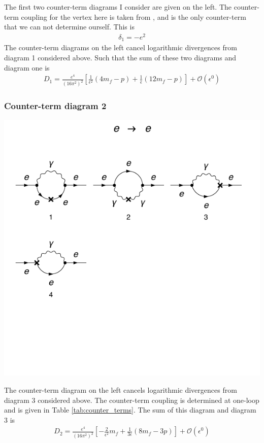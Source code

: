 \documentclass[11pt]{article}
\begin{document}
\noindent\begin{minipage}{0.7\textwidth}
The first two counter-term diagrams I consider are given on the left.  The counter-term coupling for the vertex here is taken from \cite{Sato2013}, and is the only counter-term that we can not determine ourself.  This is
\begin{align}
\delta_{1}=-e^2
\end{align}
The counter-term diagrams on the left cancel logarithmic divergences from diagram 1 considered above.  Such that the sum of these two diagrams and diagram one is
\begin{align}
D_1 = \frac{e^4}{(16\pi^2)^2} \left[ \frac{1}{\epsilon^2}(4m_f-p)+\frac{1}{\epsilon}(12m_f-p)\right]+\mathcal{O}(\epsilon^0)
\end{align}
\end{minipage}

\subsubsection{Counter-term diagram 2}
\noindent\begin{minipage}{0.3\textwidth}
\begin{center}
\includegraphics{QED_F_2loop_3c.pdf}
\end{center}
\end{minipage}
\noindent\begin{minipage}{0.7\textwidth}
The counter-term diagram on the left cancels logarithmic divergences from diagram 3 considered above.  The counter-term coupling is determined at one-loop and is given in Table \ref{tab:counter_terms}.   The sum of this diagram and diagram 3 is
\begin{align}
D_2 = \frac{e^4}{(16\pi^2)^2} \left[ -\frac{2}{\epsilon^2}m_f+\frac{1}{3\epsilon}(8m_f-3p)\right]+\mathcal{O}(\epsilon^0)
\end{align}
\end{minipage}
\end{document}
